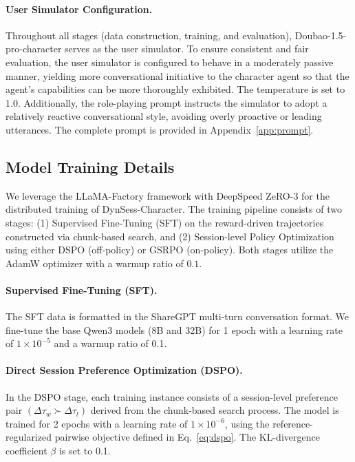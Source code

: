 


\paragraph{User Simulator Configuration.}
Throughout all stages (data construction, training, and evaluation), Doubao-1.5-pro-character serves as the user simulator. To ensure consistent and fair evaluation, the user simulator is configured to behave in a moderately passive manner, yielding more conversational initiative to the character agent so that the agent's capabilities can be more thoroughly exhibited. The temperature is set to 1.0. Additionally, the role-playing prompt instructs the simulator to adopt a relatively reactive conversational style, avoiding overly proactive or leading utterances. The complete prompt is provided in Appendix~\ref{app:prompt}.



\subsection{Model Training Details}
\label{subsec:training_details}

We leverage the LLaMA-Factory framework \cite{zheng2024llamafactory} with DeepSpeed ZeRO-3 for the distributed training of DynSess-Character. The training pipeline consists of two stages: (1) Supervised Fine-Tuning (SFT) on the reward-driven trajectories constructed via chunk-based search, and (2) Session-level Policy Optimization using either DSPO (off-policy) or GSRPO (on-policy). Both stages utilize the AdamW optimizer with a warmup ratio of $0.1$.

\paragraph{Supervised Fine-Tuning (SFT).}
The SFT data is formatted in the ShareGPT multi-turn conversation format. We fine-tune the base Qwen3 models (8B and 32B) for 1 epoch with a learning rate of $1 \times 10^{-5}$ and a warmup ratio of 0.1.


\paragraph{Direct Session Preference Optimization (DSPO).}
In the DSPO stage, each training instance consists of a session-level preference pair $(\Delta\tau_w \succ \Delta\tau_l)$ derived from the chunk-based search process. The model is trained for 2 epochs with a learning rate of $1 \times 10^{-6}$, using the reference-regularized pairwise objective defined in Eq.~\ref{eq:dspo}. The KL-divergence coefficient $\beta$ is set to 0.1.

